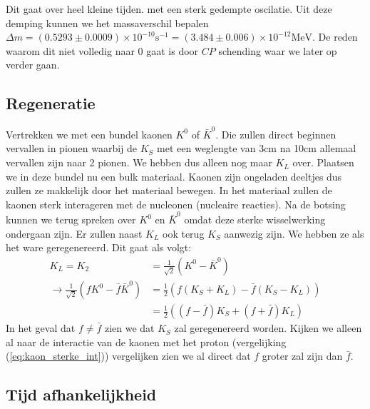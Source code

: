 \documentclass[../main.tex]{subfiles}
\begin{document}
Dit gaat over heel kleine tijden. met een sterk gedempte oscilatie. Uit deze demping kunnen we het massaverschil bepalen $\Delta m=(0.5293 \pm 0.0009) \times 10^{-10} \text{s}^{-1} = (3.484 \pm 0.006) \times 10^{-12} \text{MeV}$. De reden waarom dit niet volledig naar 0 gaat is door $CP$ schending waar we later op verder gaan.

\subsection{Regeneratie}%
\label{sub:regeneratie}

Vertrekken we met een bundel kaonen $K^0$ of $\bar{K}^0$. Die zullen direct beginnen vervallen in pionen waarbij de $K_S$ met een weglengte van 3cm na 10cm allemaal vervallen zijn naar 2 pionen. We hebben dus alleen nog maar $K_L$ over. Plaatsen we in deze bundel nu een bulk materiaal. Kaonen zijn ongeladen deeltjes dus zullen ze makkelijk door het materiaal bewegen. In het materiaal zullen de kaonen sterk interageren met de nucleonen (nucleaire reacties). Na de botsing kunnen we terug spreken over $K^0$ en $\bar{K}^0$ omdat deze sterke wisselwerking ondergaan zijn. Er zullen naast $K_L$ ook terug $K_S$ aanwezig zijn. We hebben ze als het ware geregenereerd. Dit gaat als volgt:
\begin{equation}
    \begin{aligned}
        \label{eq:ks_regen}
        K_{L}=K_{2}&=\frac{1}{\sqrt{2}}\left(K^{0}-\bar{K}^{0}\right)\\
        \rightarrow \frac{1}{\sqrt{2}}\left(f K^{0}-\bar{f} \bar{K}^{0}\right)&=\frac{1}{2}\left(f\left(K_{S}+K_{L}\right)-\bar{f}\left(K_{S}-K_{L}\right)\right) \\
                                                                              &=\frac{1}{2}\left((f-\bar{f}) K_{S}+(f+\bar{f}) K_{L}\right)
    \end{aligned}
\end{equation}
In het geval dat $f\neq \bar{f}$ zien we dat $K_S$ zal geregenereerd worden. Kijken we alleen al naar de interactie van de kaonen met het proton (vergelijking (\ref{eq:kaon_sterke_int})) vergelijken zien we al direct dat $f$ groter zal zijn dan $\bar{f}$.

\subsection{Tijd afhankelijkheid}%
\label{sub:tijd_afhankelijkheid}
\end{document}
